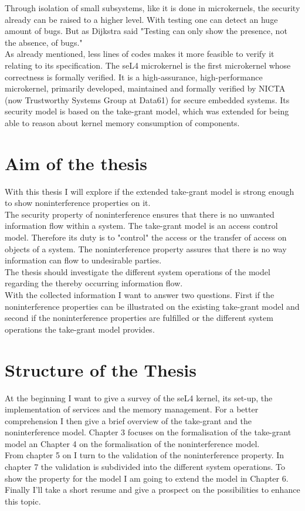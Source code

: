 Through isolation of small subsystems, like it is done in microkernels, the security already can be raised to a higher level. With testing one can detect an huge amount of bugs. But as Dijkstra said "Testing can only show the presence, not the absence, of bugs." \cite{EngTec} \\
As already mentioned, less lines of codes makes it more feasible to verify it relating to its specification. 
The seL4 microkernel is the first microkernel whose correctness is formally verified. It is a high-assurance, high-performance microkernel, primarily developed, maintained and formally verified by NICTA (now Trustworthy Systems Group at Data61) for secure embedded systems. Its security model is based on the take-grant model, which was extended for being able to reason about kernel memory consumption of components. 
	\section{Aim of the thesis}
	With this thesis I will explore if the extended take-grant model is strong enough to show noninterference properties on it. \\
	The security property of noninterference ensures that there is no unwanted information flow within a system. The take-grant model is an access control model. Therefore its duty is to "control" the access or the transfer of access on objects of a system. The noninterference property assures that there is no way information can flow to undesirable parties. \\
The thesis should investigate the different system operations of the model regarding the thereby occurring information flow. \\
With the collected information I want to answer two questions. First if the noninterference properties can be illustrated on the existing take-grant model and second if the noninterference properties are fulfilled or the different system operations the take-grant model provides. 
\section{Structure of the Thesis}
At the beginning I want to give a survey of the seL4 kernel, its set-up, the implementation of services and the memory management. For a better comprehension I then give a brief overview of the take-grant and the noninterference model. 
Chapter 3 focuses on the formalisation of the take-grant model an Chapter 4 on the formalisation of the noninterference model. \\
From chapter 5 on I turn to the validation of the noninterference property. In chapter 7 the validation is subdivided into the different system operations. To show the property for the model I am going to extend the model in Chapter 6. \\
Finally I'll take a short resume and give a prospect on the possibilities to enhance this topic.